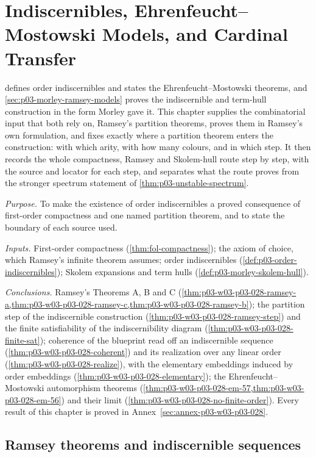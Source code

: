 \chapter{Indiscernibles, Ehrenfeucht--Mostowski Models, and Cardinal Transfer}
\label{sec:p03-w03-p03-028-chapter}

 defines order indiscernibles and states the
Ehrenfeucht--Mostowski theorems, and
\cref{sec:p03-morley-ramsey-models} proves the indiscernible and term-hull
construction in the form Morley gave it.  This chapter supplies the
combinatorial input that both rely on, Ramsey's partition theorems, proves
them in Ramsey's own formulation, and fixes exactly where a partition
theorem enters the construction: with which arity, with how many colours,
and in which step.  It then records the whole compactness, Ramsey and
Skolem-hull route step by step, with the source and locator for each step,
and separates what the route proves from the stronger spectrum statement of
\cref{thm:p03-unstable-spectrum}.

\emph{Purpose.}  To make the existence of order indiscernibles a proved
consequence of first-order compactness and one named partition theorem, and
to state the boundary of each source used.

\emph{Inputs.}  First-order compactness (\cref{thm:fol-compactness});
the axiom of choice, which Ramsey's infinite theorem assumes; order
indiscernibles (\cref{def:p03-order-indiscernibles}); Skolem expansions and
term hulls (\cref{def:p03-morley-skolem-hull}).

\emph{Conclusions.}  Ramsey's Theorems A, B and C
(\cref{thm:p03-w03-p03-028-ramsey-a,thm:p03-w03-p03-028-ramsey-c,thm:p03-w03-p03-028-ramsey-b});
the partition step of the indiscernible construction
(\cref{thm:p03-w03-p03-028-ramsey-step}) and the finite satisfiability of
the indiscernibility diagram (\cref{thm:p03-w03-p03-028-finite-sat});
coherence of the blueprint read off an indiscernible sequence
(\cref{thm:p03-w03-p03-028-coherent}) and its realization over any linear
order (\cref{thm:p03-w03-p03-028-realize}), with the elementary
embeddings induced by order embeddings
(\cref{thm:p03-w03-p03-028-elementary}); the Ehrenfeucht--Mostowski
automorphism theorems (\cref{thm:p03-w03-p03-028-em-57,thm:p03-w03-p03-028-em-56})
and their limit (\cref{thm:p03-w03-p03-028-no-finite-order}).  Every result
of this chapter is proved in Annex~\ref{sec:annex-p03-w03-p03-028}.

\section{Ramsey theorems and indiscernible sequences}
\label{sec:p03-w03-p03-028-ramsey}

